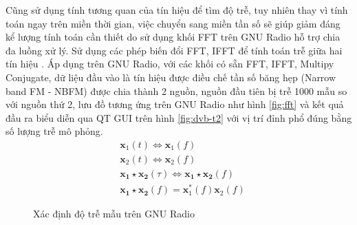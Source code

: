 Cũng sử dụng tính tương quan của tín hiệu để tìm độ trễ, tuy nhiên thay vì tính toán ngay trên miền thời gian, việc chuyển sang miền tần số sẽ giúp giảm đáng kể lượng tính toán cần thiết do sử dụng khối FFT trên GNU Radio hỗ trợ chia đa luồng xử lý. Sử dụng các phép biến đổi  FFT, IFFT để tính toán trễ giữa hai tín hiệu \cite{Nentwig2016}. Áp dụng trên GNU Radio, với các khối có sẵn FFT, IFFT, Multipy Conjugate, dữ liệu đầu vào là tín hiệu được điều chế tần số băng hẹp (Narrow band FM - NBFM) được chia thành 2 nguồn, nguồn đầu tiên bị trễ 1000 mẫu so với nguồn thứ 2, lưu đồ tương ứng trên GNU Radio như hình \ref{fig:fft} và kết quả đầu ra biểu diễn qua QT GUI trên hình \ref{fig:dvb-t2} với vị trí đỉnh phổ đúng bằng số lượng trễ mô phỏng.
\begin{equation}
\begin{split}
&\mathbf{x}_1(t) \Leftrightarrow \mathbf{x}_1(f)\\
&\mathbf{x}_2(t) \Leftrightarrow \mathbf{x}_2(f)\\
&\mathbf{x_1 \star x_2} (\tau) \Leftrightarrow \mathbf{x_1 \star x_2}(f)\\
&\mathbf{x_1 \star x_2}(f) = \mathbf{x}_1^{*}(f) \mathbf{x}_2(f)
\end{split}
\end{equation}
\begin{figure}[!h]
\centering
{}
\hfill
{}
\hfill
\caption{Xác định độ trễ mẫu trên GNU Radio}
\end{figure}

